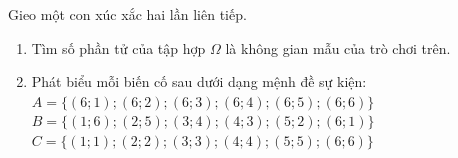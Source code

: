 \begin{bt}%
	Gieo một con xúc xắc hai lần liên tiếp.
	\begin{enumerate}
		\item Tìm số phần tử của tập hợp $ \Omega $ là không gian mẫu của trò 
		chơi trên.
		\item Phát biểu mỗi biến cố sau dưới dạng mệnh đề sự kiện: \\
		$ A=\{(6;1);(6;2);(6;3);(6;4);(6;5);(6;6)\} $ \\
		$ B=\{(1;6);(2;5);(3;4);(4;3);(5;2);(6;1)\} $ \\
		$ C=\{(1;1);(2;2);(3;3);(4;4);(5;5);(6;6)\} $  
	\end{enumerate}
	
\end{bt}

